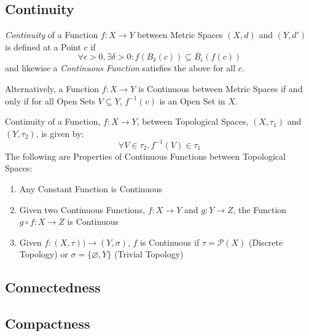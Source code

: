 \subsection{Continuity}\label{sec:topological_continuity}

\emph{Continuity} of a Function $f : X \rightarrow Y$ between Metric
Spaces $(X,d)$ and $(Y,d')$ is defined at a Point $c$
if
\[
    \forall \epsilon > 0, \exists \delta > 0 :
    f (B_{\delta}(c)) \subseteq B_{\epsilon}(f(c))
\]
and likewise a \emph{Continuous Function} satisfies the above for all
$c$.

Alternatively, a Function $f: X \rightarrow Y$ is Continuous between
Metric Spaces if and only if for all Open Sets $V \subseteq Y$,
$f^{-1}(v)$ is an Open Set in $X$.

Continuity of a Function, $f : X \rightarrow Y$, between Topological
Spaces, $(X,\tau_1)$ and $(Y,\tau_2)$, is given by:
\[
    \forall V \in \tau_2, f^{-1}(V) \in \tau_1
\]
The following are Properties of Continuous Functions between
Topological Spaces:
\begin{enumerate}
    \item Any Constant Function is Continuous
    \item Given two Continuous Functions, $f : X \rightarrow Y$ and $g
      : Y \rightarrow Z$, the Function $g \circ f : X \rightarrow Z$ is
      Continuous
    \item Given $f : (X, \tau)) \rightarrow (Y, \sigma)$, $f$ is
      Continuous if $\tau = \mathcal{P}(X)$ (Discrete Topology) or
      $\sigma = \{\varnothing, Y\}$ (Trivial Topology)
\end{enumerate}



\subsection{Connectedness}\label{sec:connectedness}

\subsection{Compactness}\label{sec:compactness}



